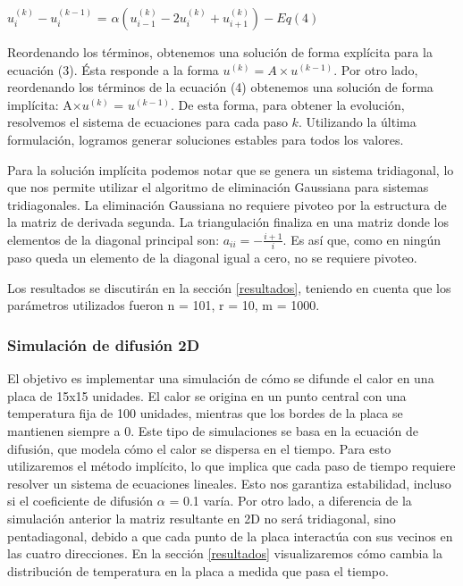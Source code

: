 \begin{center}
  $u_i^{(k)} - u_i^{(k-1)}$ = $\alpha(u_{i-1}^{(k)} - 2u_i^{(k)} + u_{i+1}^{(k)}) - Eq (4)$
\end{center}

Reordenando los términos, obtenemos una solución de forma explícita para la ecuación (3). Ésta responde a la forma $u^{(k)} = A \times u^{(k-1)}$. Por otro lado, reordenando los términos de la ecuación (4) obtenemos una solución de forma implícita: A$\times u^{(k)}$ = $u^{(k-1)}$. De esta forma, para obtener la evolución, resolvemos el sistema de ecuaciones para cada paso $k$.
Utilizando la última formulación, logramos generar soluciones estables para todos los valores.

Para la solución implícita podemos notar que se genera un sistema tridiagonal, lo que nos permite utilizar el algoritmo de eliminación Gaussiana para sistemas tridiagonales. La eliminación Gaussiana no requiere pivoteo por la estructura de la matriz de derivada segunda. La triangulación finaliza en una matriz donde los elementos de la diagonal principal son: $a_{ii} = - \frac{i+1}{i}$. 
Es así que, como en ningún paso queda un elemento de la diagonal igual a cero, no se requiere pivoteo.\par
Los resultados se discutirán en la sección \ref{resultados}, teniendo en cuenta que los parámetros utilizados fueron n = 101, r = 10, m = 1000.


\subsubsection{Simulación de difusión 2D}
 El objetivo es implementar una simulación de cómo se difunde el calor en una placa de 15x15 unidades. El calor se origina en un punto central con una temperatura fija de 100 unidades, mientras que los bordes de la placa se mantienen siempre a 0. Este tipo de simulaciones se basa en la ecuación de difusión, que modela cómo el calor se dispersa en el tiempo.
 Para esto utilizaremos el método implícito, lo que implica que cada paso de tiempo requiere resolver un sistema de ecuaciones lineales. Esto nos garantiza estabilidad, incluso si el coeficiente de difusión $\alpha$ = 0.1 varía.
Por otro lado, a diferencia de la simulación anterior la matriz resultante en 2D no será tridiagonal, sino pentadiagonal, debido a que cada punto de la placa interactúa con sus vecinos en las cuatro direcciones.
En la sección \ref{resultados} visualizaremos cómo cambia la distribución de temperatura en la placa a medida que pasa el tiempo.


